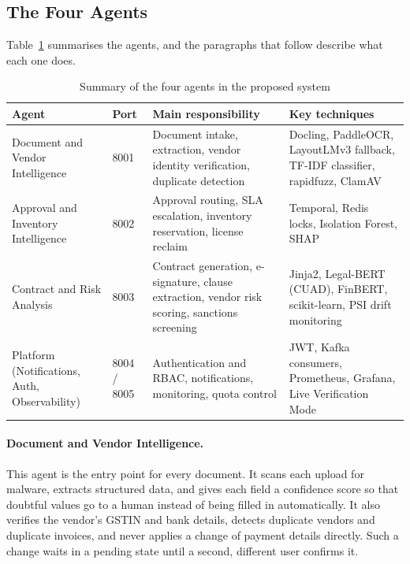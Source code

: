 \subsection{The Four Agents}

Table~\ref{tab:agents} summarises the agents, and the paragraphs that follow describe what each one does.

\begin{table}[!htbp]
\centering
\footnotesize
\renewcommand{\arraystretch}{1.2}
\caption{Summary of the four agents in the proposed system}
\label{tab:agents}
\begin{tabular}{|p{}|p{}|p{}|p{}|}
\hline
\raggedright \textbf{Agent} & \raggedright \textbf{Port} & \raggedright \textbf{Main responsibility} & \raggedright \textbf{Key techniques} \tabularnewline \hline
\raggedright Document and Vendor Intelligence & \raggedright 8001 & \raggedright Document intake, extraction, vendor identity verification, duplicate detection & \raggedright Docling, PaddleOCR, LayoutLMv3 fallback, TF-IDF classifier, rapidfuzz, ClamAV \tabularnewline \hline
\raggedright Approval and Inventory Intelligence & \raggedright 8002 & \raggedright Approval routing, SLA escalation, inventory reservation, license reclaim & \raggedright Temporal, Redis locks, Isolation Forest, SHAP \tabularnewline \hline
\raggedright Contract and Risk Analysis & \raggedright 8003 & \raggedright Contract generation, e-signature, clause extraction, vendor risk scoring, sanctions screening & \raggedright Jinja2, Legal-BERT (CUAD), FinBERT, scikit-learn, PSI drift monitoring \tabularnewline \hline
\raggedright Platform (Notifications, Auth, Observability) & \raggedright 8004 / 8005 & \raggedright Authentication and RBAC, notifications, monitoring, quota control & \raggedright JWT, Kafka consumers, Prometheus, Grafana, Live Verification Mode \tabularnewline \hline
\end{tabular}
\end{table}

\paragraph{Document and Vendor Intelligence.} This agent is the entry point for every document. It scans each upload for malware, extracts structured data, and gives each field a confidence score so that doubtful values go to a human instead of being filled in automatically. It also verifies the vendor's GSTIN and bank details, detects duplicate vendors and duplicate invoices, and never applies a change of payment details directly. Such a change waits in a pending state until a second, different user confirms it.


